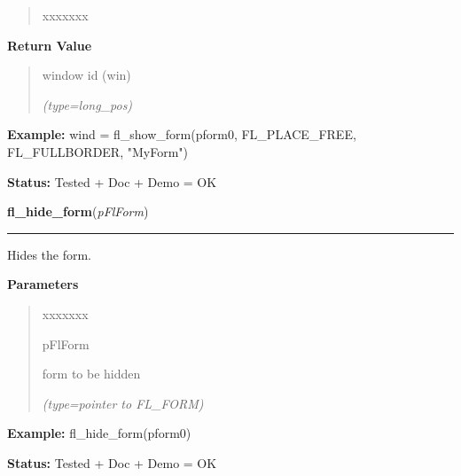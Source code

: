 \begin{boxedminipage}{\funcwidth}
\begin{quote}
\begin{Ventry}{xxxxxxx}
        \end{Ventry}

      \end{quote}

      \textbf{Return Value}
    \vspace{-1ex}

      \begin{quote}
      window id (win)

      {\it (type=long\_pos)}

      \end{quote}

\textbf{Example:} wind = fl\_show\_form(pform0, FL\_PLACE\_FREE, FL\_FULLBORDER, "MyForm")



\textbf{Status:} Tested + Doc + Demo = OK



    \end{boxedminipage}

    \label{xformslib:flbasic:fl_hide_form}

    \vspace{0.5ex}

\hspace{.8\funcindent}\begin{boxedminipage}{\funcwidth}

    \raggedright \textbf{fl\_hide\_form}(\textit{pFlForm})

    \vspace{-1.5ex}

    \rule{\textwidth}{0.5\fboxrule}
\setlength{\parskip}{2ex}
    Hides the form.

\setlength{\parskip}{1ex}
      \textbf{Parameters}
      \vspace{-1ex}

      \begin{quote}
        \begin{Ventry}{xxxxxxx}

          \item[pFlForm]

          form to be hidden

            {\it (type=pointer to FL\_FORM)}

        \end{Ventry}

      \end{quote}

\textbf{Example:} fl\_hide\_form(pform0)



\textbf{Status:} Tested + Doc + Demo = OK



    \end{boxedminipage}

